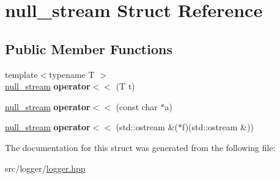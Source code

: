 \hypertarget{structnull__stream}{\section{null\-\_\-stream Struct Reference}
\label{structnull__stream}
}
\subsection*{Public Member Functions}
\begin{DoxyCompactItemize}
\item 
\hypertarget{structnull__stream_a72053224b3d432b8111453a0aec3fdd1}{{\footnotesize template$<$typename T $>$ }\\\hyperlink{structnull__stream}{null\-\_\-stream} {\bfseries operator$<$$<$} (T t)}\label{structnull__stream_a72053224b3d432b8111453a0aec3fdd1}

\item 
\hypertarget{structnull__stream_abfaf81817f085afaaf8717478f26bc97}{\hyperlink{structnull__stream}{null\-\_\-stream} {\bfseries operator$<$$<$} (const char $\ast$a)}\label{structnull__stream_abfaf81817f085afaaf8717478f26bc97}

\item 
\hypertarget{structnull__stream_a1394a183e7860103bc59b6e5bdf8644b}{\hyperlink{structnull__stream}{null\-\_\-stream} {\bfseries operator$<$$<$} (std\-::ostream \&($\ast$f)(std\-::ostream \&))}\label{structnull__stream_a1394a183e7860103bc59b6e5bdf8644b}

\end{DoxyCompactItemize}


The documentation for this struct was generated from the following file\-:\begin{DoxyCompactItemize}
\item 
src/logger/\hyperlink{logger_8hpp}{logger.\-hpp}\end{DoxyCompactItemize}
